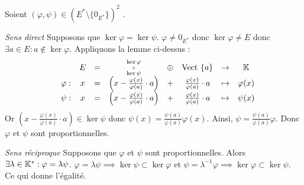 \documentclass{article}
\renewenvironment{question_kholle}[2][ ]
{
	\subsection{\texorpdfstring{#2}{}}
	\notblank{#1}
	{
		\noindent #1
		\bigbreak
	}
	{}
	\begin{proof}
}
{
	\end{proof}
}
\begin{document}
\begin{question_kholle}
		\noindent Soient $\left(\varphi,\psi\right) \in \left( E^* \setminus \{0_{E^*}\} \right) ^2$ \fqs.
		
		\textit{Sens direct
		} Supposons que $\ker \varphi = \ker \psi$.
		$\varphi \neq 0_{E^*}$ donc $\ker \varphi \neq E$ donc $\exists a \in E : a \notin \ker \varphi$. Appliquons la lemme ci-dessus :
		\begin{equation*}
			\begin{array}{ccccccccc}
				& & E &=& \substack{\ker \varphi \\ \shortparallel \\ \ker \psi} &\oplus& \text{Vect }{\{a\}} & \rightarrow & \mathbb K \\
				& \varphi : & x &=& \left( x - \frac{\varphi(x)}{\varphi(a)} \cdot a \right) &+& \frac{\varphi(x)}{\varphi(a)} \cdot a & \mapsto & \varphi(x) \\
				& \psi : & x &=& \left( x - \frac{\varphi(x)}{\varphi(a)} \cdot a \right) &+& \frac{\varphi(x)}{\varphi(a)} \cdot a & \mapsto & \psi(x)
			\end{array}
		\end{equation*}
		Or $\left( x - \frac{\varphi(x)}{\varphi(a)} \cdot a \right) \in \ker \psi$ donc $\psi(x) = \frac{\psi(a)}{\varphi(a)} \varphi(x)$.
		Ainsi, $\psi = \frac{\psi(a)}{\varphi(a)} \varphi$. Donc $\varphi$ et $\psi$ sont proportionnelles.
		
		\textit{Sens réciproque} Supposons que $\varphi$ et $\psi$ sont proportionnelles. Alors $\exists \lambda \in \mathbb K^* : \varphi = \lambda \psi$.
		$\varphi = \lambda \psi \implies \ker \psi \subset \ker \varphi$ et
		$\psi = \lambda^{-1} \varphi \implies \ker \varphi \subset \ker \psi$.
		Ce qui donne l'égalité.
	\end{question_kholle}
	
\end{document}
